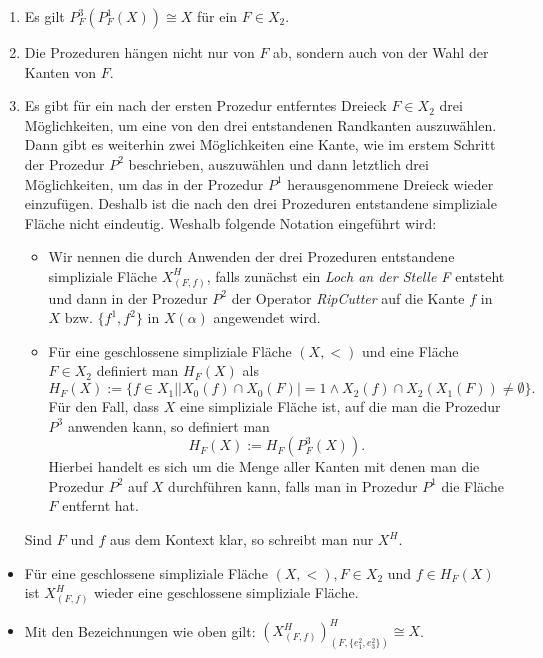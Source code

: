 \documentclass[12pt,titlepage]{article}
\begin{document}
\begin{bemerkung}
\begin{enumerate}
\item Es gilt $P^3_F(P^1_F(X))\cong X$ für ein $F \in X_2 $.
\item Die Prozeduren hängen nicht nur von $F$ ab, sondern auch von der Wahl der Kanten von $F$.
\item Es gibt für ein nach der ersten Prozedur entferntes Dreieck $F \in X_{2}$ drei Möglichkeiten, um eine von den drei entstandenen Randkanten auszuwählen. Dann gibt es weiterhin zwei Möglichkeiten eine Kante, wie im erstem Schritt der Prozedur $P^2$ beschrieben, auszuwählen und dann letztlich drei Möglichkeiten, um das in der Prozedur $P^1$ herausgenommene Dreieck wieder einzufügen. Deshalb ist die nach den drei Prozeduren entstandene simpliziale Fläche nicht eindeutig. Weshalb folgende Notation eingeführt wird: \\
\begin{itemize}
\item Wir nennen die durch Anwenden der drei Prozeduren entstandene simpliziale Fläche $X^{H}_{(F,f)}$, falls zunächst ein \emph{Loch an der Stelle F} entsteht und dann in der Prozedur $P^2$ der Operator \emph{RipCutter} auf die Kante $f$ in $X$ bzw. $\{f^1,f^2\}$ in $X(\alpha)$ angewendet wird. 
\item Für eine geschlossene simpliziale Fläche $(X,<)$ und eine Fläche $F \in X_2$ definiert man \emph{$H_F(X)$} als 
\[
H_F(X):=\{f \in X_1\mid \vert X_{0}(f) \cap X_{0}(F)\vert = 1 \land X_2(f) \cap X_2(X_1(F))\neq \emptyset\} .
\] 
Für den Fall, dass $X$ eine simpliziale Fläche ist, auf die man die Prozedur $P^3$ anwenden kann, so definiert man
\[
H_F(X):=H_F(P^3_F(X)).
\]
Hierbei handelt es sich um die Menge aller Kanten mit denen man die Prozedur $P^2$ auf $X$
durchführen kann, falls man in Prozedur $P^1$ die Fläche $F$ entfernt hat.
 \end{itemize}
 Sind $F$ und $f$ aus dem Kontext klar, so schreibt man nur $X^H$.
 \end{enumerate}
\end{bemerkung}
\begin{bemerkung}
\begin{itemize}
\item Für eine geschlossene simpliziale Fläche $(X,<),F \in X_2$ und $f \in H_F(X)$ ist $X^H_{(F,f)}$ wieder eine geschlossene simpliziale Fläche.
\item Mit den Bezeichnungen wie oben gilt: $(X^H_{(F,f)})^H_{(F,\{e_1^2,e_3^2\})}\cong X$.


\end{itemize}
\end{bemerkung}
\end{document}
